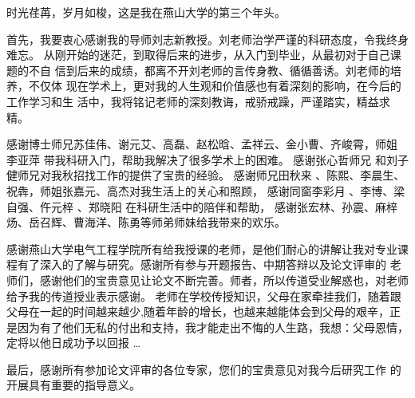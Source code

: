 \makeatletter
{}
  \pagestyle{fancy}%
  \fancyhf{}
\makeatother

\begin{thanks}
\begin{comment}
\end{comment}
时光荏苒，岁月如梭，这是我在燕山大学的第三个年头。

首先，我要衷心感谢我的导师刘志新教授。刘老师治学严谨的科研态度，令我终身难忘。
从刚开始的迷茫，到取得后来的进步，从入门到毕业，从最初对于自己课题的不自
信到后来的成绩，都离不开刘老师的言传身教、循循善诱。刘老师的培养，不仅体
现在学术上，更对我的人生观和价值感也有着深刻的影响，在今后的工作学习和生
活中，我将铭记老师的深刻教诲，戒骄戒躁，严谨踏实，精益求精。

 感谢博士师兄苏佳伟、谢元艾、高磊、赵松晗、孟祥云、金小曹、齐峻霄，师姐 李亚萍 带我科研入门，帮助我解决了很多学术上的困难。
 感谢张心哲师兄  和刘子健师兄对我秋招找工作的提供了宝贵的经验。
 感谢师兄田秋来 、陈熙、李晨生、祝犇，师姐张嘉元、高杰对我生活上的关心和照顾，
 感谢同窗李彩月 、李博、梁自强、仵元梓 、郑晓阳  在科研生活中的陪伴和帮助，%
 感谢张宏林、孙震、麻梓炀、岳召辉、曹海洋、陈勇等师弟师妹给我带来的欢乐。

 感谢燕山大学电气工程学院所有给我授课的老师，是他们耐心的讲解让我对专业课程有了深入的了解与研究。感谢所有参与开题报告、中期答辩以及论文评审的
老师们，感谢他们的宝贵意见让论文不断完善。师者，所以传道受业解惑也，对老师给予我的传道授业表示感谢。
老师在学校传授知识，父母在家牵挂我们，随着跟父母在一起的时间越来越少,随着年龄的增长，也越来越能体会到父母的艰辛，正是因为有了他们无私的付出和支持，我才能走出不悔的人生路，我想：父母恩情，定将以他日成功予以回报
…

最后，感谢所有参加论文评审的各位专家，您们的宝贵意见对我今后研究工作
的开展具有重要的指导意义。


\end{thanks}
